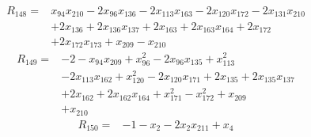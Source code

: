 \begin{align*} R_{148}={}&x_{94}x_{210} -2 x_{96}x_{136} -2 x_{113}x_{163} -2 x_{120}x_{172} -2 x_{131}x_{210}
\\ &+2 x_{136} +2 x_{136}x_{137} +2 x_{163} +2 x_{163}x_{164} +2 x_{172}
\\ &+2 x_{172}x_{173} +x_{209} -x_{210}
\end{align*}
\begin{align*} R_{149}={}&-2 -x_{94}x_{209} +x_{96}^{2} -2 x_{96}x_{135} +x_{113}^{2}
\\ &-2 x_{113}x_{162} +x_{120}^{2} -2 x_{120}x_{171} +2 x_{135} +2 x_{135}x_{137}
\\ &+2 x_{162} +2 x_{162}x_{164} +x_{171}^{2} -x_{172}^{2} +x_{209}
\\ &+x_{210}
\end{align*}
\begin{align*} R_{150}={}&-1 -x_{2} -2 x_{2}x_{211} +x_{4}
\end{align*}
